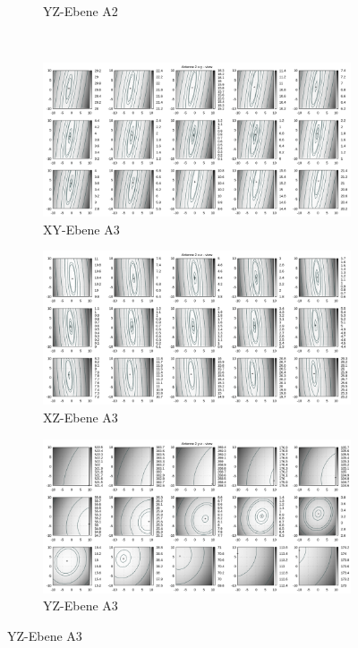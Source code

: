 \begin{appendix}
\begin{landscape}
\begin{figure}[!ht]
\begin{subfigure}[t]{0.5\textwidth}
	             \caption{YZ-Ebene A2}
	\end{subfigure}
\\
	\centering
	\begin{subfigure}[t]{0.5\textwidth}
	     \centering
	     \includegraphics[width=\textwidth]{img/fitness/xy/a2.png}
	             \caption{XY-Ebene A3}
	\end{subfigure}
	\begin{subfigure}[t]{0.5\textwidth}
		\centering
	     \includegraphics[width=\textwidth]{img/fitness/xz/a2.png}
				\caption{XZ-Ebene A3}
	\end{subfigure}
	\begin{subfigure}[t]{0.5\textwidth}
			\centering
	   \includegraphics[width=\textwidth]{img/fitness/yz/a2.png}
				\caption{YZ-Ebene A3}
	\end{subfigure}
\end{figure}
\newpage
%

\end{landscape}
\end{appendix}
